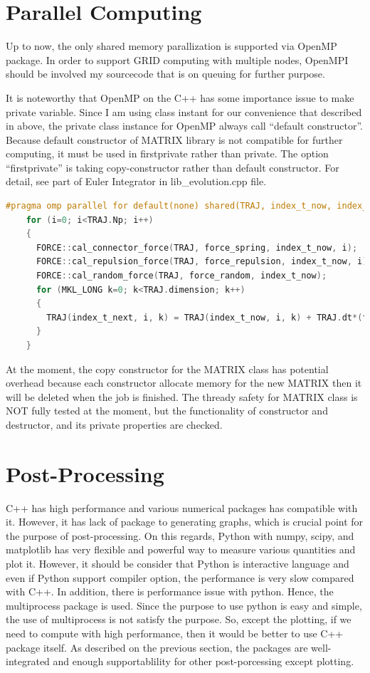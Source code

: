 \documentclass[10pt, a4paper]{report}
\begin{document}
\begin{appendices}
  \chapter{Parallel Computing}
  Up to now, the only shared memory parallization is supported via OpenMP package. In order to support GRID computing with multiple nodes, OpenMPI should be involved my sourcecode that is on queuing for further purpose. 

  It is noteworthy that OpenMP on the C++ has some importance issue to make private variable. Since I am using class instant for our convenience that described in above, the private class instance for OpenMP always call ``default constructor''. Because default constructor of MATRIX library is not compatible for further computing, it must be used in firstprivate rather than private. The option ``firstprivate'' is taking copy-constructor rather than default constructor.
  For detail, see part of Euler Integrator in lib{\_}evolution.cpp file.
  \begin{lstlisting}[language=C++,frame=single]
    #pragma omp parallel for default(none) shared(TRAJ, index_t_now, index_t_next) firstprivate(force_spring, force_repulsion, force_random)
    for (i=0; i<TRAJ.Np; i++)
    {
      FORCE::cal_connector_force(TRAJ, force_spring, index_t_now, i);
      FORCE::cal_repulsion_force(TRAJ, force_repulsion, index_t_now, i);
      FORCE::cal_random_force(TRAJ, force_random, index_t_now);
      for (MKL_LONG k=0; k<TRAJ.dimension; k++)
      {
        TRAJ(index_t_next, i, k) = TRAJ(index_t_now, i, k) + TRAJ.dt*(force_spring(k) + force_repulsion(k)) + sqrt(TRAJ.dt)*force_random(k);
      }
    }
  \end{lstlisting}

  At the moment, the copy constructor for the MATRIX class has potential overhead because each constructor allocate memory for the new MATRIX then it will be deleted when the job is finished. The thready safety for MATRIX class is NOT fully tested at the moment, but the functionality of constructor and destructor, and its private properties are checked.

  \chapter{Post-Processing}
  C++ has high performance and various numerical packages has compatible with it. However, it has lack of package to generating graphs, which is crucial point for the purpose of post-processing. On this regards, Python with numpy, scipy, and matplotlib has very flexible and powerful way to measure various quantities and plot it. However, it should be consider that Python is interactive language and even if Python support compiler option, the performance is very slow compared with C++. In addition, there is performance issue with python. Hence, the multiprocess package is used. Since the purpose to use python is easy and simple, the use of multiprocess is not satisfy the purpose. So, except the plotting, if we need to compute with high performance, then it would be better to use C++ package itself. As described on the previous section, the packages are well-integrated and enough supportablility for other post-porcessing except plotting. 


\end{appendices}
\end{document}

